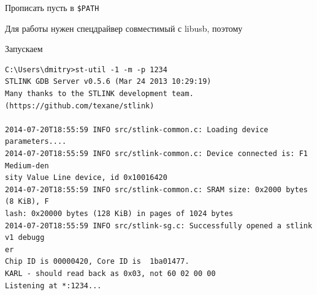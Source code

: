 
Прописать пусть в \verb|$PATH|


Для работы нужен спецдрайвер совместимый с libusb, поэтому





Запускаем 

\begin{lstlisting}[style=con]
C:\Users\dmitry>st-util -1 -m -p 1234
STLINK GDB Server v0.5.6 (Mar 24 2013 10:29:19)
Many thanks to the STLINK development team.
(https://github.com/texane/stlink)

2014-07-20T18:55:59 INFO src/stlink-common.c: Loading device parameters....
2014-07-20T18:55:59 INFO src/stlink-common.c: Device connected is: F1 Medium-den
sity Value Line device, id 0x10016420
2014-07-20T18:55:59 INFO src/stlink-common.c: SRAM size: 0x2000 bytes (8 KiB), F
lash: 0x20000 bytes (128 KiB) in pages of 1024 bytes
2014-07-20T18:55:59 INFO src/stlink-sg.c: Successfully opened a stlink v1 debugg
er
Chip ID is 00000420, Core ID is  1ba01477.
KARL - should read back as 0x03, not 60 02 00 00
Listening at *:1234...
\end{lstlisting}

\bigskip
{}







